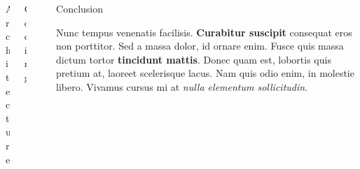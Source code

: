 \documentclass[final]{beamer}
\newlength{\sepwid}
\newlength{\onecolwid}
\newlength{\twocolwid}
\begin{document}
\begin{frame}[t]
\begin{columns}[t]
\begin{column}{\twocolwid}
\begin{columns}[t,totalwidth=\twocolwid]
\begin{column}{\onecolwid}
\begin{block}{Architecture}
\end{block}


\end{column} %

\begin{column}{\onecolwid} %


\begin{block}{Coding}

\end{block}


\end{column} %

\end{columns} %

\end{column} %

\begin{column}{\sepwid}\end{column} %

\begin{column}{\onecolwid} %


\begin{block}{Conclusion}

Nunc tempus venenatis facilisis. \textbf{Curabitur suscipit} consequat eros non porttitor. Sed a massa dolor, id ornare enim. Fusce quis massa dictum tortor \textbf{tincidunt mattis}. Donec quam est, lobortis quis pretium at, laoreet scelerisque lacus. Nam quis odio enim, in molestie libero. Vivamus cursus mi at \textit{nulla elementum sollicitudin}.

\end{block}



\end{column}
\end{columns}
\end{frame}
\end{document}
